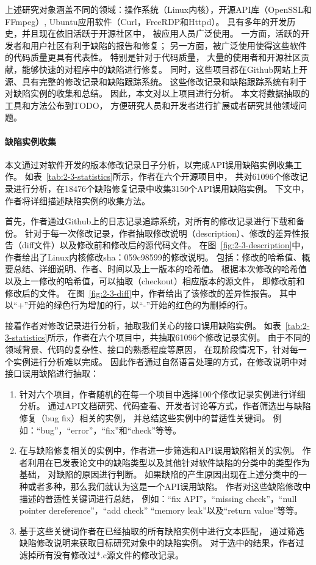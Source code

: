 上述研究对象涵盖不同的领域：操作系统（Linux内核），开源API库（OpenSSL和FFmpeg）,
Ubuntu应用软件（Curl，FreeRDP和Httpd）。
具有多年的开发历史，并且现在依旧活跃于开源社区中，
被应用人员广泛使用。
一方面，活跃的开发者和用户社区有利于缺陷的报告和修复；
另一方面，被广泛使用使得这些软件的代码质量更具有代表性。
特别是针对于代码质量，
大量的使用者和开源社区贡献，能够快速的对程序中的缺陷进行修复。
同时，这些项目都在Github网站上开源、具有完整的修改记录和缺陷跟踪系统。
这些修改记录和缺陷跟踪系统有利于对缺陷实例的收集和总结。
因此，本文对以上项目进行分析。
本文将数据抽取的工具和方法公布到TODO，
方便研究人员和开发者进行扩展或者研究其他领域问题。

\paragraph{缺陷实例收集}





本文通过对软件开发的版本修改记录日子分析，以完成API误用缺陷实例收集工作。
如表~\ref{tab:2-3-statistics}所示，作者在六个开源项目中，
共对61096个修改记录进行分析，在18476个缺陷修复记录中收集3150个API误用缺陷实例。
下文中，作者将详细描述缺陷实例的收集方法。

首先，作者通过Github上的日志记录追踪系统，对所有的修改记录进行下载和备份。
针对于每一次修改记录，作者抽取修改说明（description）、修改的差异性报告（diff文件）以及修改前和修改后的源代码文件。
在图~\ref{fig:2-3-description}中，作者给出了Linux内核修改sha：059c98599的修改说明。
包括：修改的哈希值、概要总结、详细说明、作者、时间以及上一版本的哈希值。
根据本次修改的哈希值以及上一修改的哈希值，可以抽取（checkout）相应版本的源文件，
即修改前和修改后的文件。
在图~\ref{fig:2-3-diff}中，作者给出了该修改的差异性报告。
其中以“+”开始的绿色行为增加的行，以“-”开始的红色的为删掉的行。

接着作者对修改记录进行分析，抽取我们关心的接口误用缺陷实例。
如表~\ref{tab:2-3-statistics}所示，作者在六个项目中，共抽取61096个修改记录实例。
由于不同的领域背景、代码的复杂性、接口的熟悉程度等原因，
在现阶段情况下，针对每一个实例进行分析难以完成。
因此作者通过自然语言处理的方式，在修改说明中对接口误用缺陷进行抽取：
\begin{enumerate}
	\item 针对六个项目，作者随机的在每一个项目中选择100个修改记录实例进行详细分析。
	通过API文档研究、代码查看、开发者讨论等方式，作者筛选出与缺陷修复（bug fix）相关的实例，
	并总结这些实例中的普适性关键词。
	例如：“bug”，“error”，“fix”和“check”等等。
	\item 在与缺陷修复相关的实例中，作者进一步筛选和API误用缺陷相关的实例。
	作者利用在已发表论文中的缺陷类型以及其他针对软件缺陷的分类中的类型作为基础，
	对缺陷的原因进行判断。
	如果缺陷的产生原因出现在上述分类中的一种或者多种，那么我们就认为这是一个API误用缺陷。
	作者对这些缺陷修改中描述的普适性关键词进行总结，
	例如：“fix API”，“missing check”，“null pointer dereference”，“add check” “memory leak”以及“return value”等等。
	\item 基于这些关键词作者在已经抽取的所有缺陷实例中进行文本匹配，
	通过筛选缺陷修改说明来获取目标研究对象中的缺陷实例。
	对于选中的结果，作者过滤掉所有没有修改过*.c源文件的修改记录。
\end{enumerate}

